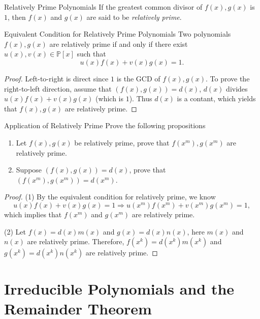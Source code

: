 \begin{definition}{Relatively Prime Polynomials}{}
  If the greatest common divisor of $f(x), g(x)$ is $1$,
  then $f(x)$ and $g(x)$ are said to be \emph{relatively prime}.
\end{definition}

\begin{proposition}{Equivalent Condition for Relatively Prime Polynomials}{}
  Two polynomials $f(x), g(x)$ are relatively prime if and only if
  there exist $u(x), v(x) \in \mathbb{P}[x]$ such that
  \begin{equation}
    u(x)f(x) + v(x)g(x) = 1.
  \end{equation}
\end{proposition}

\begin{proof}
  Left-to-right is direct since $1$ is the GCD of $f(x), g(x)$.
  To prove the right-to-left direction, assume that $(f(x), g(x)) = d(x)$,
  $d(x)$ divides $u(x)f(x) + v(x)g(x)$ (which is $1$).
  Thus $d(x)$ is a contant, which yields that $f(x), g(x)$ are relatively prime.
\end{proof}

\begin{example}{Application of Relatively Prime}{}
  Prove the following propositions
  \begin{enumerate}
  \item Let $f(x), g(x)$ be relatively prime, prove that $f(x^m), g(x^m)$
    are relatively prime.
  \item Suppose $(f(x), g(x)) = d(x)$, prove that $(f(x^m), g(x^m)) = d(x^m)$.
  \end{enumerate}
\end{example}

\begin{proof}
  (1) By the equivalent condition for relatively prime, we know
  \begin{equation}
    u(x)f(x) + v(x)g(x) = 1 \Rightarrow u(x^m)f(x^m) + v(x^m)g(x^m) = 1,
  \end{equation}
  which implies that $f(x^m)$ and $g(x^m)$ are relatively prime.

  (2) Let $f(x) = d(x)m(x)$ and $g(x) = d(x)n(x)$, here $m(x)$ and $n(x)$ are
  relatively prime.
  Therefore, $f(x^k) = d(x^k)m(x^k)$ and $g(x^k) = d(x^k)n(x^k)$ are relatively prime.
\end{proof}

\section{Irreducible Polynomials and the Remainder Theorem}

